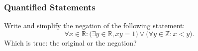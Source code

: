 \documentclass{beamer}
\begin{document}
\begin{frame}
\frametitle{Quantified Statements}

Write and simplify the negation of the following statement:
\[
    \forall x \in \mathbb{R} :
    \big(\exists y \in \mathbb{R}, xy = 1\big)
    \lor \big(\forall y \in \mathbb{Z} : x < y \big).
\]
Which is true: the original or the negation?

\end{frame}
\end{document}
